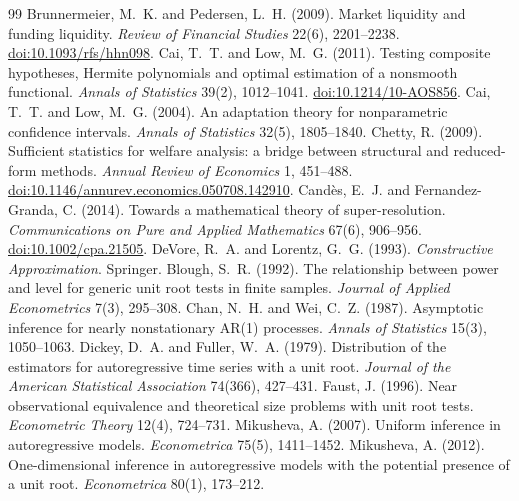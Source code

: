 \begin{thebibliography}{99}\setlength{\itemsep}{2pt}\small
{} Brunnermeier, M.~K. and Pedersen, L.~H. (2009). Market liquidity and funding liquidity. \emph{Review of Financial Studies} 22(6), 2201--2238. \href{https://doi.org/10.1093/rfs/hhn098}{doi:10.1093/rfs/hhn098}.
 Cai, T.~T. and Low, M.~G. (2011). Testing composite hypotheses, Hermite polynomials and optimal estimation of a nonsmooth functional. \emph{Annals of Statistics} 39(2), 1012--1041. \href{https://doi.org/10.1214/10-AOS856}{doi:10.1214/10-AOS856}.
 Cai, T.~T. and Low, M.~G. (2004). An adaptation theory for nonparametric confidence intervals. \emph{Annals of Statistics} 32(5), 1805--1840.
 Chetty, R. (2009). Sufficient statistics for welfare analysis: a bridge between structural and reduced-form methods. \emph{Annual Review of Economics} 1, 451--488. \href{https://doi.org/10.1146/annurev.economics.050708.142910}{doi:10.1146/annurev.economics.050708.142910}.
 Cand\`es, E.~J. and Fernandez-Granda, C. (2014). Towards a mathematical theory of super-resolution. \emph{Communications on Pure and Applied Mathematics} 67(6), 906--956. \href{https://doi.org/10.1002/cpa.21505}{doi:10.1002/cpa.21505}.
 DeVore, R.~A. and Lorentz, G.~G. (1993). \emph{Constructive Approximation}. Springer.
 Blough, S.~R. (1992). The relationship between power and level for generic unit root tests in finite samples. \emph{Journal of Applied Econometrics} 7(3), 295--308.
 Chan, N.~H. and Wei, C.~Z. (1987). Asymptotic inference for nearly nonstationary AR(1) processes. \emph{Annals of Statistics} 15(3), 1050--1063.
 Dickey, D.~A. and Fuller, W.~A. (1979). Distribution of the estimators for autoregressive time series with a unit root. \emph{Journal of the American Statistical Association} 74(366), 427--431.
 Faust, J. (1996). Near observational equivalence and theoretical size problems with unit root tests. \emph{Econometric Theory} 12(4), 724--731.
 Mikusheva, A. (2007). Uniform inference in autoregressive models. \emph{Econometrica} 75(5), 1411--1452.
 Mikusheva, A. (2012). One-dimensional inference in autoregressive models with the potential presence of a unit root. \emph{Econometrica} 80(1), 173--212.

\end{thebibliography}
